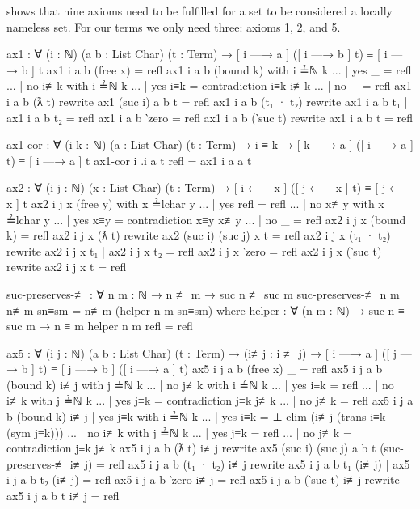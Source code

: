 \citet{pitts_locally_2023} shows that nine axioms need to be fulfilled for a set to be considered a
locally nameless set. For our terms we only need three: axioms 1, 2, and 5.
\begin{code}
  ax1 : ∀ (i : ℕ) (a b : List Char) (t : Term)
    → [ i —→ a ] ([ i —→ b ] t) ≡ [ i —→ b ] t
  ax1 i a b (free x) = refl
  ax1 i a b (bound k) with i ≟ℕ k
  ... | yes _   = refl
  ... | no  i≢k with i ≟ℕ k
  ...   | yes i≡k = contradiction i≡k i≢k
  ...   | no  _   = refl
  ax1 i a b (ƛ t) rewrite ax1 (suc i) a b t = refl
  ax1 i a b (t₁ · t₂) rewrite ax1 i a b t₁ | ax1 i a b t₂ = refl
  ax1 i a b ‵zero = refl
  ax1 i a b (‵suc t) rewrite ax1 i a b t = refl

  ax1-cor : ∀ (i k : ℕ) (a : List Char) (t : Term)
    → i ≡ k
    → [ k —→ a ] ([ i —→ a ] t) ≡ [ i —→ a ] t
  ax1-cor i .i a t refl = ax1 i a a t

  ax2 : ∀ (i j : ℕ) (x : List Char) (t : Term)
     → [ i ←— x ] ([ j ←— x ] t) ≡ [ j ←— x ] t
  ax2 i j x (free y) with x ≟lchar y
  ... | yes refl = refl
  ... | no  x≢y with x ≟lchar y
  ...   | yes x≡y = contradiction x≡y x≢y
  ...   | no  _   = refl
  ax2 i j x (bound k) = refl
  ax2 i j x (ƛ t) rewrite ax2 (suc i) (suc j) x t = refl
  ax2 i j x (t₁ · t₂) rewrite ax2 i j x t₁ | ax2 i j x t₂ = refl
  ax2 i j x ‵zero = refl
  ax2 i j x (‵suc t) rewrite ax2 i j x t = refl

  suc-preserves-≢ : ∀ {n m : ℕ} → n ≢ m → suc n ≢ suc m
  suc-preserves-≢ {n} {m} n≢m sn≡sm = n≢m (helper n m sn≡sm)
    where
      helper : ∀ (n m : ℕ) → suc n ≡ suc m → n ≡ m
      helper n m refl = refl

  ax5 : ∀ (i j : ℕ) (a b : List Char) (t : Term)
    → (i≢j : i ≢ j)
    → [ i —→ a ] ([ j —→ b ] t) ≡ [ j —→ b ] ([ i —→ a ] t)
  ax5 i j a b (free x) _ = refl
  ax5 i j a b (bound k) i≢j with j ≟ℕ k
  ... | no  j≢k with i ≟ℕ k
  ...   | yes i≡k = refl
  ...   | no  i≢k with j ≟ℕ k
  ...     | yes j≡k = contradiction j≡k j≢k
  ...     | no  j≢k = refl
  ax5 i j a b (bound k) i≢j | yes j≡k with i ≟ℕ k
  ...   | yes i≡k = ⊥-elim (i≢j (trans i≡k (sym j≡k)))
  ...   | no  i≢k with j ≟ℕ k
  ...     | yes j≡k = refl
  ...     | no  j≢k = contradiction j≡k j≢k
  ax5 i j a b (ƛ t) i≢j
    rewrite ax5 (suc i) (suc j) a b t (suc-preserves-≢ i≢j) = refl
  ax5 i j a b (t₁ · t₂) i≢j
    rewrite ax5 i j a b t₁ (i≢j) | ax5 i j a b t₂ (i≢j) = refl
  ax5 i j a b ‵zero i≢j = refl
  ax5 i j a b (‵suc t) i≢j rewrite ax5 i j a b t i≢j = refl
\end{code}

